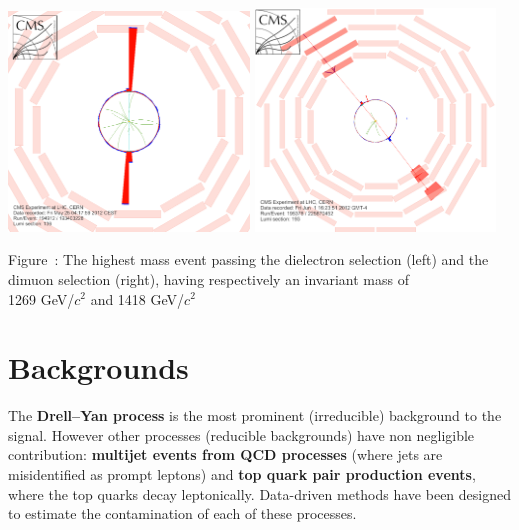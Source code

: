 \documentclass[a0b,portrait,preview]{a0poster}
\begin{document}
\begin{multicols}{3}
\begin{minipage}{\figwidth}
\vspace{1.0cm}
\unitlength=1cm
\begin{center}
{\includegraphics[width= 0.48\textwidth]{figure/ev1269GeV_rhophi.png}}
{\includegraphics[width= 0.48\textwidth]{figure/ev_mumu_1418GeV_rhophi.png}}
\newline
\addtocounter{figscount}{1} 
{\small \captcolor Figure~: The highest mass event passing the dielectron selection (left) and the dimuon selection (right), having respectively an invariant mass of\\ 1269 GeV/$c^{2}$ and 1418 GeV/$c^{2}$}
\end{center}
\label{mass}
\end{minipage}

\vspace*{1 cm}
{\red \section*{\bf Backgrounds}}
The \textbf{Drell--Yan process} is the most prominent (irreducible) background to the signal. 
However other processes (reducible backgrounds) have non negligible contribution: \textbf{multijet events from QCD processes} (where jets are misidentified as prompt leptons) and  
\textbf{top quark pair production events}, where the top quarks decay leptonically.
Data-driven methods have been designed to estimate the contamination of each of these processes.\\


\end{multicols}
\end{document}
